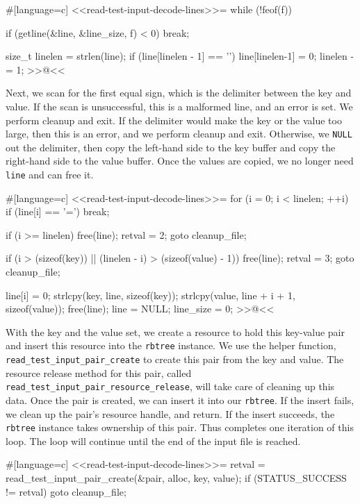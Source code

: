 {#[language=c]
<<read-test-input-decode-lines>>=
    while (!feof(f))
    {
        if (getline(&line, &line_size, f) < 0)
        {
            break;
        }

        size_t linelen = strlen(line);
        if (line[linelen - 1] == '\n')
        {
            line[linelen-1] = 0;
            linelen -= 1;
        }
>>@<<

Next, we scan for the first equal sign, which is the delimiter between the key
and value. If the scan is unsuccessful, this is a malformed line, and an error
is set. We perform cleanup and exit.  If the delimiter would make the key or the
value too large, then this is an error, and we perform cleanup and exit.
Otherwise, we \verb/NULL/ out the delimiter, then copy the left-hand side to the
key buffer and copy the right-hand side to the value buffer. Once the values are
copied, we no longer need \verb/line/ and can free it.

#[language=c]
<<read-test-input-decode-lines>>=
        for (i = 0; i < linelen; ++i)
            if (line[i] == '=')
                break;

        if (i >= linelen)
        {
            free(line);
            retval = 2;
            goto cleanup_file;
        }

        if (i > (sizeof(key)) || (linelen - i) > (sizeof(value) - 1))
        {
            free(line);
            retval = 3;
            goto cleanup_file;
        }

        line[i] = 0;
        strlcpy(key, line, sizeof(key));
        strlcpy(value, line + i + 1, sizeof(value));
        free(line);
        line = NULL;
        line_size = 0;
>>@<<

With the key and the value set, we create a resource to hold this key-value pair
and insert this resource into the \verb/rbtree/ instance. We use the helper
function, \verb/read_test_input_pair_create/ to create this pair from the key
and value.  The resource release method for this pair, called
\verb/read_test_input_pair_resource_release/, will take care of cleaning up this
data. Once the pair is created, we can insert it into our \verb/rbtree/. If the
insert fails, we clean up the pair's resource handle, and return. If the insert
succeeds, the \verb/rbtree/ instance takes ownership of this pair. Thus
completes one iteration of this loop. The loop will continue until the end of
the input file is reached.

#[language=c]
<<read-test-input-decode-lines>>=
        retval = read_test_input_pair_create(&pair, alloc, key, value);
        if (STATUS_SUCCESS != retval)
        {
            goto cleanup_file;
        }

}}
